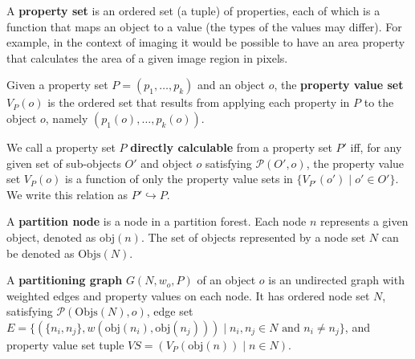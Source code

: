 \begin{definition}
A \textbf{property set} is an ordered set (a tuple) of properties, each of which is a function that maps an object to a value (the types of the values may differ). For example, in the context of imaging it would be possible to have an area property that calculates the area of a given image region in pixels.
\end{definition}

\begin{definition}
Given a property set $P = (p_1,\ldots,p_k)$ and an object $o$, the \textbf{property value set} $V_P(o)$ is the ordered set that results from applying each property in $P$ to the object $o$, namely $(p_1(o),\ldots,p_k(o))$.
\end{definition}

\begin{definition}
We call a property set $P$ \textbf{directly calculable} from a property set $P'$ iff, for any given set of sub-objects $O'$ and object $o$ satisfying $\mathcal{P}(O',o)$, the property value set $V_P(o)$ is a function of only the property value sets in $\{V_{P'}(o') \; | \; o' \in O'\}$. We write this relation as $P' \hookrightarrow P$.
\end{definition}

\begin{definition}
A \textbf{partition node} is a node in a partition forest. Each node $n$ represents a given object, denoted as $\mbox{obj}(n)$. The set of objects represented by a node set $N$ can be denoted as $\mbox{Objs}(N)$.
\end{definition}

\begin{definition}
A \textbf{partitioning graph} $G(N,w_o,P)$ of an object $o$ is an undirected graph with weighted edges and property values on each node. It has ordered node set $N$, satisfying $\mathcal{P}(\mbox{Objs}(N),o)$, edge set $E = \{(\{n_i,n_j\},w(\mbox{obj}(n_i),\mbox{obj}(n_j))) \; | \; n_i, n_j \in N \mbox{ and } n_i \ne n_j\}$, and property value set tuple $\textit{VS} = (V_P(\mbox{obj}(n)) \; | \; n \in N)$.
\end{definition}

